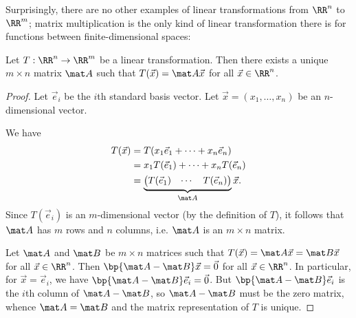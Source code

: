 Surprisingly, there are no other examples of linear transformations from $\RR^n$ to $\RR^m$; matrix multiplication is the only kind of linear transformation there is for functions between finite-dimensional spaces:

\begin{proposition}\label{prop:matrix-mult-lin-trans}
    Let $T : \RR^n \to \RR^m$ be a linear transformation. Then there exists a unique $m \times n$ matrix $\mat A$ such that $T(\vec x) = \mat A \vec x$ for all $\vec x \in \RR^n$.
\end{proposition}
\begin{proof}
    Let $\vec e_i$ be the $i$th standard basis vector. Let $\vec x = (x_1, \dots, x_n)$ be an $n$-dimensional vector.
    
    \item{} We have
    \begin{align*}
        T(\vec x) &= T(x_1 \vec e_1 + \dots + x_n \vec e_n)\\
        &= x_1 T(\vec e_1) + \dots + x_n T(\vec e_n)\\
        &= \underbrace{\begin{pmatrix}T(\vec e_1) & \cdots & T(\vec e_n)\end{pmatrix}}_{\mat A} \vec x.
    \end{align*}
    Since $T(\vec e_i)$ is an $m$-dimensional vector (by the definition of $T$), it follows that $\mat A$ has $m$ rows and $n$ columns, i.e. $\mat A$ is an $m \times n$ matrix.

    \item{} Let $\mat A$ and $\mat B$ be $m \times n$ matrices such that $T(\vec x) = \mat A \vec x = \mat B \vec x$ for all $\vec x \in \RR^n$. Then $\bp{\mat A - \mat B} \vec x = \vec 0$ for all $\vec x \in \RR^n$. In particular, for $\vec x = \vec e_i$, we have $\bp{\mat A - \mat B} \vec e_i = \vec 0$. But $\bp{\mat A - \mat B} \vec e_i$ is the $i$th column of $\mat A - \mat B$, so $\mat A - \mat B$ must be the zero matrix, whence $\mat A = \mat B$ and the matrix representation of $T$ is unique.
\end{proof}

